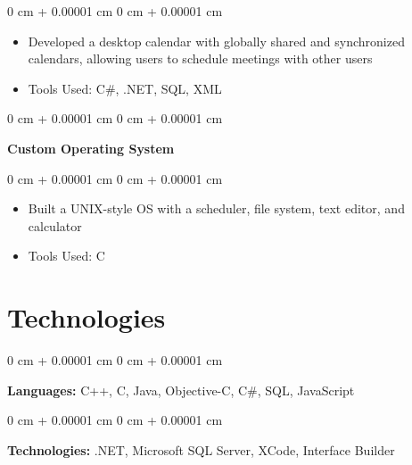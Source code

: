 \documentclass[10pt, letterpaper]{article}
\newenvironment{highlights}{
    \begin{itemize}[
        topsep=0.10 cm,
        parsep=0.10 cm,
        partopsep=0pt,
        itemsep=0pt,
        leftmargin=0 cm + 10pt
    ]
}{
    \end{itemize}
} %
\newenvironment{onecolentry}{
    \begin{adjustwidth}{
        0 cm + 0.00001 cm
    }{
        0 cm + 0.00001 cm
    }
}{
    \end{adjustwidth}
} %
\newenvironment{twocolentry}[2][]{
    \onecolentry
    \def\secondColumn{#2}
    \setcolumnwidth{\fill, 4.5 cm}
    \begin{paracol}{2}
}{
    \switchcolumn \raggedleft \secondColumn
    \end{paracol}
    \endonecolentry
} %
\begin{document}
\vspace{0.10 cm}
\begin{onecolentry}
      \begin{highlights}
            \item Developed a desktop calendar with globally shared and synchronized calendars,
            allowing users to schedule meetings with other users
            \item Tools Used: C\#, .NET, SQL, XML
      \end{highlights}
\end{onecolentry}

\vspace{0.2 cm}

\begin{twocolentry}{
            2002
      }
      \textbf{Custom Operating System}\end{twocolentry}

\vspace{0.10 cm}
\begin{onecolentry}
      \begin{highlights}
            \item Built a UNIX-style OS with a scheduler, file system, text editor, and
            calculator
            \item Tools Used: C
      \end{highlights}
\end{onecolentry}

\section{Technologies}

\begin{onecolentry}
      \textbf{Languages:} C++, C, Java, Objective-C, C\#, SQL, JavaScript
\end{onecolentry}

\vspace{0.2 cm}

\begin{onecolentry}
      \textbf{Technologies:} .NET, Microsoft SQL Server, XCode, Interface Builder
\end{onecolentry}
\end{document}
